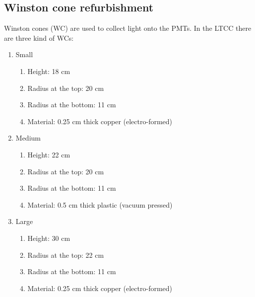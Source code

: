 \subsection{Winston cone refurbishment}

Winston cones (WC) are used to collect light onto the PMTs. In the LTCC there are three kind of WCs:

\begin{enumerate}

\item Small
	\begin{enumerate}
		\item Height: 18 cm
		\item Radius at the top: 20 cm
		\item Radius at the bottom: 11 cm
		\item Material: 0.25 cm thick copper (electro-formed)
	\end{enumerate}

	\item Medium
	\begin{enumerate}
		\item Height: 22 cm
		\item Radius at the top: 20 cm
		\item Radius at the bottom: 11 cm
		\item Material: 0.5 cm thick plastic (vacuum pressed)
	\end{enumerate}

	\item Large
	\begin{enumerate}
		\item Height: 30 cm
		\item Radius at the top: 22 cm
		\item Radius at the bottom: 11 cm
		\item Material: 0.25 cm thick copper (electro-formed)
	\end{enumerate}
\end{enumerate}

